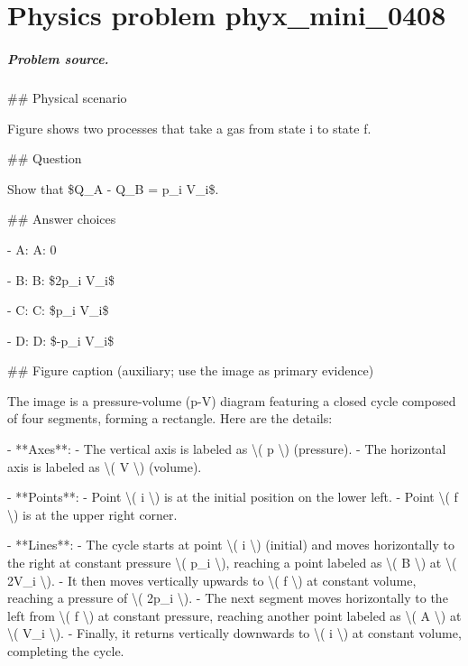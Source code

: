 
\chapter{Physics problem phyx\_mini\_0408}
\label{ch:PhyXMiniProblems_problem_phyx_mini_0408}

\paragraph{Problem source.}
\#\# Physical scenario

Figure shows two processes that take a gas from state i to state f.

\#\# Question

Show that \$Q\_A - Q\_B = p\_i V\_i\$.

\#\# Answer choices

- A: A: 0

- B: B: \$2p\_i V\_i\$

- C: C: \$p\_i V\_i\$

- D: D: \$-p\_i V\_i\$

\#\# Figure caption (auxiliary; use the image as primary evidence)

The image is a pressure-volume (p-V) diagram featuring a closed cycle composed of four segments, forming a rectangle. Here are the details:

- **Axes**: 
  - The vertical axis is labeled as \textbackslash{}( p \textbackslash{}) (pressure).
  - The horizontal axis is labeled as \textbackslash{}( V \textbackslash{}) (volume).
  
- **Points**:
  - Point \textbackslash{}( i \textbackslash{}) is at the initial position on the lower left.
  - Point \textbackslash{}( f \textbackslash{}) is at the upper right corner.
  
- **Lines**:
  - The cycle starts at point \textbackslash{}( i \textbackslash{}) (initial) and moves horizontally to the right at constant pressure \textbackslash{}( p\_i \textbackslash{}), reaching a point labeled as \textbackslash{}( B \textbackslash{}) at \textbackslash{}( 2V\_i \textbackslash{}).
  - It then moves vertically upwards to \textbackslash{}( f \textbackslash{}) at constant volume, reaching a pressure of \textbackslash{}( 2p\_i \textbackslash{}).
  - The next segment moves horizontally to the left from \textbackslash{}( f \textbackslash{}) at constant pressure, reaching another point labeled as \textbackslash{}( A \textbackslash{}) at \textbackslash{}( V\_i \textbackslash{}).
  - Finally, it returns vertically downwards to \textbackslash{}( i \textbackslash{}) at constant volume, completing the cycle.

